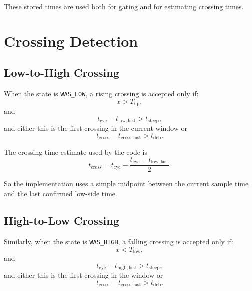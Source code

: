 \documentclass[conference]{IEEEtran}
\begin{document}
These stored times are used both for gating and for estimating crossing times.

\section{Crossing Detection}

\subsection{Low-to-High Crossing}

When the state is \texttt{WAS\_LOW}, a rising crossing is accepted only if:
\begin{equation}
  x > T_{\mathrm{up}},
\end{equation}
and
\begin{equation}
  t_{\mathrm{cyc}} - t_{\mathrm{low,last}} > t_{\mathrm{steep}},
\end{equation}
and either this is the first crossing in the current window or
\begin{equation}
  t_{\mathrm{cross}} - t_{\mathrm{cross,last}} > t_{\mathrm{deb}}.
\end{equation}

The crossing time estimate used by the code is
\begin{equation}
  t_{\mathrm{cross}}
  =
  t_{\mathrm{cyc}}
  - \frac{t_{\mathrm{cyc}} - t_{\mathrm{low,last}}}{2}.
\end{equation}

So the implementation uses a simple midpoint between the current sample time
and the last confirmed low-side time.

\subsection{High-to-Low Crossing}

Similarly, when the state is \texttt{WAS\_HIGH}, a falling crossing is
accepted only if:
\begin{equation}
  x < T_{\mathrm{low}},
\end{equation}
and
\begin{equation}
  t_{\mathrm{cyc}} - t_{\mathrm{high,last}} > t_{\mathrm{steep}},
\end{equation}
and either this is the first crossing in the window or
\begin{equation}
  t_{\mathrm{cross}} - t_{\mathrm{cross,last}} > t_{\mathrm{deb}}.
\end{equation}
\end{document}
